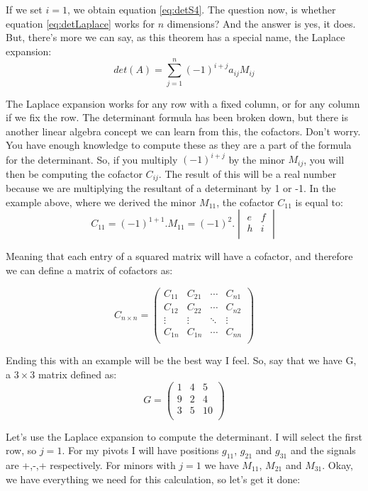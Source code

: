 \documentclass[a4,12pt,twosided,openany]{memoir}
\begin{document}
\indent
If we set $i=1$, we obtain equation \ref{eq:detS4}. The question now, is whether equation \ref{eq:detLaplace} works for $n$ dimensions? And the answer is yes, it does. But, there’s more we can say, as this theorem has a special name, the Laplace expansion:
\[det(A) = \sum_{j=1}^n(-1)^{i+j}a_{ij}M_{ij}\]
\par 
\indent
The Laplace expansion works for any row with a fixed column, or for any column if we fix the row. The determinant formula has been broken down, but there is another linear algebra concept we can learn from this, the cofactors. Don’t worry. You have enough knowledge to compute these as they are a part of the formula for the determinant. So, if you multiply  $(-1)^{i+j}$  by the minor $M_{ij}$, you will then be computing the cofactor $C_{ij}$. The result of this will be a real number because we are multiplying the resultant of a determinant by 1 or -1. In the example above, where we derived the minor $M_{11}$, the cofactor $C_{11}$ is equal to:
\[C_{11} = (-1)^{1+1}.M_{11} =  (-1)^{2}.\begin{vmatrix}
e & f  \\
h & i \\
\end{vmatrix}\]
\par 
\indent
Meaning that each entry of a squared matrix will have a cofactor, and therefore we can define a matrix of cofactors as:
\par 
\indent
\[C_{n \times n } = 
\begin{pmatrix}
C_{11} & C_{21} & \cdots & C_{n1}\\
C_{12} & C_{22} &\cdots & C_{n2} \\
\vdots & \vdots & \ddots & \vdots \\
C_{1n} & C_{1n}& \cdots & C_{nn}\\
\end{pmatrix}
\]
\par 
\indent
Ending this with an example will be the best way I feel. So, say that we have G, a $3 \times 3$ matrix defined as:
\[ G = 
\begin{pmatrix}
1 & 4 & 5 \\
9 & 2 & 4 \\
3 & 5 & 10 \\
\end{pmatrix}
\]
\par 
\indent
Let’s use the Laplace expansion to compute the determinant. I will select the first row, so $j=1$. For my pivots I will have positions $g_{11}$, $g_{21}$ and $g_{31}$ and the signals are +,-,+ respectively. For minors with  $j=1$ we have $M_{11}$, $M_{21}$ and $M_{31}$. Okay, we have everything we need for this calculation, so let’s get it done:
\end{document}
